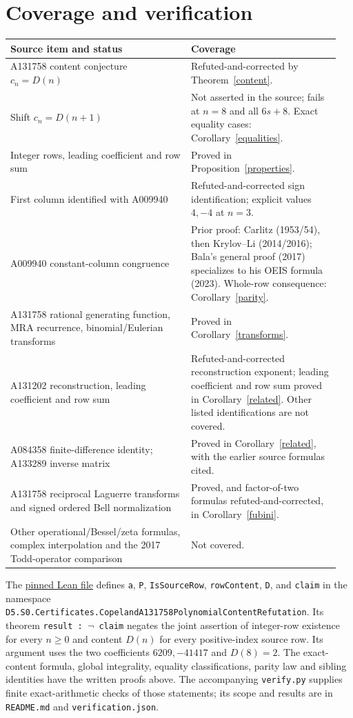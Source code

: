 \documentclass[11pt]{article}
\begin{document}
\section{Coverage and verification}
\small
\begin{longtable}{@{}>{\raggedright\arraybackslash}p{0.52\linewidth}>{\raggedright\arraybackslash}p{0.43\linewidth}@{}}
\toprule Source item and status & Coverage\\\midrule\endhead
A131758 content conjecture $c_n=D(n)$ & Refuted-and-corrected by Theorem~\ref{content}.\\
Shift $c_n=D(n+1)$ & Not asserted in the source; fails at $n=8$ and all $6s+8$. Exact equality cases: Corollary~\ref{equalities}.\\
Integer rows, leading coefficient and row sum & Proved in Proposition~\ref{properties}.\\
First column identified with A009940 & Refuted-and-corrected sign identification; explicit values $4,-4$ at $n=3$.\\
A009940 constant-column congruence & Prior proof: Carlitz (1953/54), then Krylov--Li (2014/2016); Bala's general proof (2017) specializes to his OEIS formula (2023). Whole-row consequence: Corollary~\ref{parity}.\\
A131758 rational generating function, MRA recurrence, binomial/Eulerian transforms & Proved in Corollary~\ref{transforms}.\\
A131202 reconstruction, leading coefficient and row sum & Refuted-and-corrected reconstruction exponent; leading coefficient and row sum proved in Corollary~\ref{related}. Other listed identifications are not covered.\\
A084358 finite-difference identity; A133289 inverse matrix & Proved in Corollary~\ref{related}, with the earlier source formulas cited.\\
A131758 reciprocal Laguerre transforms and signed ordered Bell normalization & Proved, and factor-of-two formulas refuted-and-corrected, in Corollary~\ref{fubini}.\\
Other operational/Bessel/zeta formulas, complex interpolation and the 2017 Todd-operator comparison & Not covered.\\
\bottomrule
\end{longtable}
\normalsize
The \href{https://github.com/the-omega-institute/trureturing/blob/742ce086eb9c8e6e36cde0fcdf712f63260c045c/D5/S0/Certificates/CopelandA131758PolynomialContentRefutation.lean}{pinned Lean file}
defines \texttt{a}, \texttt{P}, \texttt{IsSourceRow}, \texttt{rowContent},
\texttt{D}, and \texttt{claim} in the namespace
\texttt{D5.S0.Certificates.CopelandA131758PolynomialContentRefutation}.
Its theorem \texttt{result : $\neg$ claim} negates the joint assertion
of integer-row existence for every $n\geq0$ and content $D(n)$ for every
positive-index source row. Its argument uses the two coefficients
$6209,-41417$ and $D(8)=2$. The exact-content formula, global integrality,
equality classifications, parity law and sibling identities have the
written proofs above. The accompanying \texttt{verify.py} supplies finite
exact-arithmetic checks of those statements; its scope and results are in
\texttt{README.md} and \texttt{verification.json}.
\end{document}

